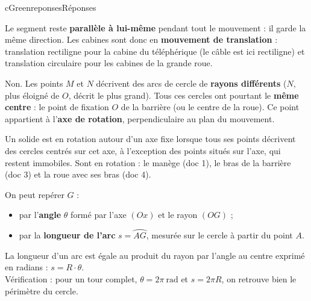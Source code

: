 \documentclass[11pt,a4paper]{article}
\newcommand{\arc}[1]{\overparen{#1}}
\begin{document}
\begin{rub}{cGreen}{reponses}{Réponses}
\begin{reps}
  \item Le segment reste \textbf{parallèle à lui-même} pendant tout le mouvement : il garde la même direction. Les cabines sont donc en \textbf{mouvement de translation} : translation rectiligne pour la cabine du téléphérique (le câble est ici rectiligne) et translation circulaire pour les cabines de la grande roue.
  \item Non. Les points $M$ et $N$ décrivent des arcs de cercle de \textbf{rayons différents} ($N$, plus éloigné de $O$, décrit le plus grand). Tous ces cercles ont pourtant le \textbf{même centre} : le point de fixation $O$ de la barrière (ou le centre de la roue). Ce point appartient à l’\textbf{axe de rotation}, perpendiculaire au plan du mouvement.
  \item Un solide est en rotation autour d’un axe fixe lorsque tous ses points décrivent des cercles centrés sur cet axe, à l’exception des points situés sur l’axe, qui restent immobiles. Sont en rotation : le manège (doc 1), le bras de la barrière (doc 3) et la roue avec ses bras (doc 4).
  \item On peut repérer $G$ :
  \begin{itemize}
    \item par l’\textbf{angle} $\theta$ formé par l’axe $(Ox)$ et le rayon $(OG)$ ;
    \item par la \textbf{longueur de l’arc} $s = \arc{AG}$, mesurée sur le cercle à partir du point $A$.
  \end{itemize}
  \item La longueur d’un arc est égale au produit du rayon par l’angle au centre exprimé en radians : $s = R\cdot\theta$.\\
  Vérification : pour un tour complet, $\theta = 2\pi~\text{rad}$ et $s = 2\pi R$, on retrouve bien le périmètre du cercle.
\end{reps}
\end{rub}
\end{document}
